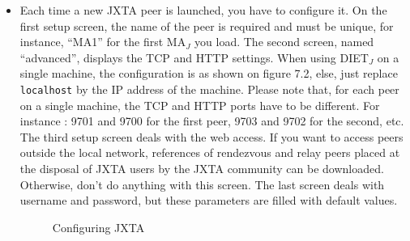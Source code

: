 \begin{itemize}
  \item{Each time a new JXTA peer is launched, you have to configure
      it.  On the first setup screen, the name of the peer is required
      and must be unique, for instance, ``MA1'' for the first MA$_{J}$
      you load. The second screen, named ``advanced'', displays the
      TCP and HTTP settings. When using DIET$_{J}$ on a single
      machine, the configuration is as shown on figure 7.2, else, just
      replace \texttt{localhost} by the IP address of the machine.
      Please note that, for each peer on a single machine, the TCP and
      HTTP ports have to be different. For instance : 9701 and 9700
      for the first peer, 9703 and 9702 for the second, etc. The third
      setup screen deals with the web access. If you want to access
      peers outside the local network, references of rendezvous and
      relay peers placed at the disposal of JXTA users by the JXTA
      community can be downloaded. Otherwise, don't do anything with
      this screen. The last screen deals with username and password,
      but these parameters are filled with default values.}
\begin{figure}[htb]
 \begin{center}
  \caption{Configuring JXTA}
 \end{center}
\end{figure}


\end{itemize}
